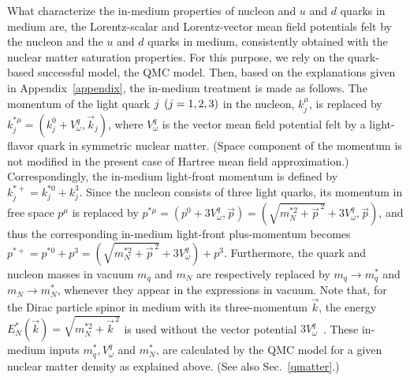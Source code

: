 \documentclass[preprint,aps,showpacs,floatfix]{revtex4}
\begin{document}
What characterize the in-medium properties of nucleon and $u$ and $d$ quarks in medium 
are, the Lorentz-scalar and Lorentz-vector mean field potentials felt by 
the nucleon and the $u$ and $d$ quarks in medium, consistently obtained with the 
nuclear matter saturation properties. For this purpose, we rely on the 
quark-based successful model, the QMC model.  
Then, based on the explanations given in Appendix~\ref{appendix}, 
the in-medium treatment is made as follows. 
The momentum of the light quark $j \hspace{1ex} (j=1,2,3)$ in the nucleon,    
$k_j^\mu$, is replaced by $k_j^{*\mu} = (k_j^0 + V^q_\omega, \vec{k}_j)$,  
where $V^q_\omega$ is the vector mean field potential  
felt by a light-flavor quark in symmetric nuclear matter. 
(Space component of the momentum is not modified in the present 
case of Hartree mean field approximation.)
Correspondingly, the in-medium light-front momentum is defined by  
$k^{*+}_j = k^{*0}_j + k^3_j$.
Since the nucleon consists of three light quarks, 
its momentum in free space $p^\mu$ is replaced by   
$p^{* \mu} = (p^0 + 3 V^q_\omega, \vec{p}) 
= (\sqrt{m_N^{*2} + \vec{p}^{\,2}} + 3 V^q_\omega, \vec{p})$, and thus 
the corresponding in-medium light-front plus-momentum becomes 
$p^{*+} = p^{*0} + p^3 = (\sqrt{m_N^{*2} + \vec{p}^{\,2}} + 3 V^q_\omega) + p^3$. 
Furthermore, the quark and nucleon masses in vacuum $m_q$ and $m_N$ are respectively 
replaced by $m_q \to m^*_q$ and $m_N \to m^*_N$, whenever they appear 
in the expressions in vacuum.
Note that, for the Dirac particle spinor in medium with its three-momentum $\vec{k}$, 
the energy $E_N^*(\vec{k}) = \sqrt{m_N^{* 2} + \vec{k}^{\,2}}$ is used 
without the vector potential $3 V^q_\omega$~\cite{QHDHF}.
These in-medium inputs $m_q^*, V^q_\omega$ and $m_N^*$, are calculated 
by the QMC model for a given nuclear matter density as explained above.
(See also Sec.~\ref{qmatter}.) 
\end{document}
